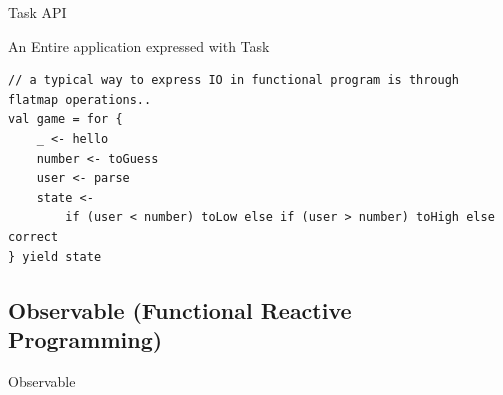 \documentclass[presentation, 9pt]{beamer}\mode<presentation>{\usetheme{AMSBolognaFC}}
\begin{document}
\begin{frame}{Task API}
\begin{alertblock}{An Entire application expressed with Task}
\begin{tcolorbox}[left=0pt, top=0pt, bottom=0pt]
\begin{verbatim}
// a typical way to express IO in functional program is through flatmap operations..
val game = for {
	_ <- hello
	number <- toGuess
	user <- parse
	state <-
		if (user < number) toLow else if (user > number) toHigh else correct
} yield state
					\end{verbatim}
				\end{tcolorbox}
		\end{alertblock}
\end{frame}
\subsection{Observable (Functional Reactive Programming)}
\begin{frame}{Observable \href{https://monix.io/docs/current/reactive/observable.html}{\faLink}}


\end{frame}
\end{document}
